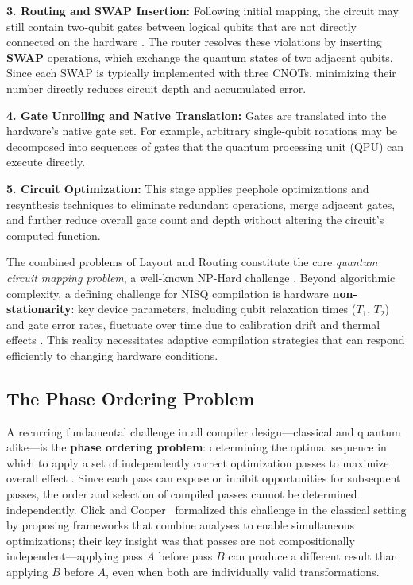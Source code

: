 \documentclass[conference]{IEEEtran}
\begin{document}
\textbf{3. Routing and SWAP Insertion:} Following initial mapping, the circuit may still contain two-qubit gates between logical qubits that are not directly connected on the hardware \cite{li2019tackling}. The router resolves these violations by inserting \textbf{SWAP} operations, which exchange the quantum states of two adjacent qubits. Since each SWAP is typically implemented with three CNOTs, minimizing their number directly reduces circuit depth and accumulated error.

\textbf{4. Gate Unrolling and Native Translation:} Gates are translated into the hardware's native gate set. For example, arbitrary single-qubit rotations may be decomposed into sequences of gates that the quantum processing unit (QPU) can execute directly.

\textbf{5. Circuit Optimization:} This stage applies peephole optimizations and resynthesis techniques to eliminate redundant operations, merge adjacent gates, and further reduce overall gate count and depth without altering the circuit's computed function.

The combined problems of Layout and Routing constitute the core \textit{quantum circuit mapping problem}, a well-known NP-Hard challenge \cite{itoko2020optimization}. Beyond algorithmic complexity, a defining challenge for NISQ compilation is hardware \textbf{non-stationarity}: key device parameters, including qubit relaxation times ($T_1$, $T_2$) and gate error rates, fluctuate over time due to calibration drift and thermal effects \cite{tannu2019not}. This reality necessitates adaptive compilation strategies that can respond efficiently to changing hardware conditions.

\subsection{The Phase Ordering Problem}

A recurring fundamental challenge in all compiler design—classical and quantum alike—is the \textbf{phase ordering problem}: determining the optimal sequence in which to apply a set of independently correct optimization passes to maximize overall effect \cite{click1995combining}. Since each pass can expose or inhibit opportunities for subsequent passes, the order and selection of compiled passes cannot be determined independently. Click and Cooper~\cite{click1995combining} formalized this challenge in the classical setting by proposing frameworks that combine analyses to enable simultaneous optimizations; their key insight was that passes are not compositionally independent—applying pass $A$ before pass $B$ can produce a different result than applying $B$ before $A$, even when both are individually valid transformations.
\end{document}
